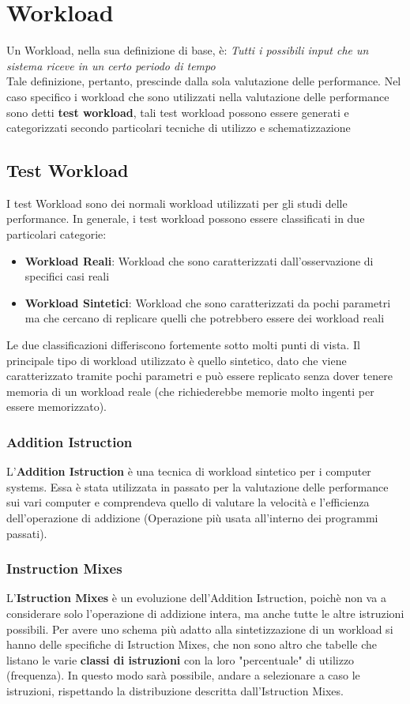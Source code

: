 \chapter{Workload}
Un Workload, nella sua definizione di base, è: \textit{Tutti i possibili input che un sistema riceve in un certo periodo di tempo}
\\
Tale definizione, pertanto, prescinde dalla sola valutazione delle performance. Nel caso specifico i workload che sono utilizzati nella valutazione delle performance sono detti \textbf{test workload}, tali test workload possono essere generati e categorizzati secondo particolari tecniche di utilizzo e schematizzazione

\section{Test Workload}
I test Workload sono dei normali workload utilizzati per gli studi delle performance. In generale, i test workload possono essere classificati in due particolari categorie:
\begin{itemize}
    \item \textbf{Workload Reali}: Workload che sono caratterizzati dall'osservazione di specifici casi reali
    \item \textbf{Workload Sintetici}: Workload che sono caratterizzati da pochi parametri ma che cercano di replicare quelli che potrebbero essere dei workload reali
\end{itemize}

Le due classificazioni differiscono fortemente sotto molti punti di vista. Il principale tipo di workload utilizzato è quello sintetico, dato che viene caratterizzato tramite pochi parametri e può essere replicato senza dover tenere memoria di un workload reale (che richiederebbe memorie molto ingenti per essere memorizzato).

\subsection{Addition Istruction}
L'\textbf{Addition Istruction} è una tecnica di workload sintetico per i computer systems. Essa è stata utilizzata in passato per la valutazione delle performance sui vari computer e comprendeva quello di valutare la velocità e l'efficienza dell'operazione di addizione (Operazione più usata all'interno dei programmi passati).

\subsection{Instruction Mixes}
L'\textbf{Istruction Mixes} è un evoluzione dell'Addition Istruction, poichè non va a considerare solo l'operazione di addizione intera, ma anche tutte le altre istruzioni possibili. Per avere uno schema più adatto alla sintetizzazione di un workload si hanno delle specifiche di Istruction Mixes, che non sono altro che tabelle che listano le varie \textbf{classi di istruzioni} con la loro "percentuale" di utilizzo (frequenza). In questo modo sarà possibile, andare a selezionare a caso le istruzioni, rispettando la distribuzione descritta dall'Istruction Mixes.

